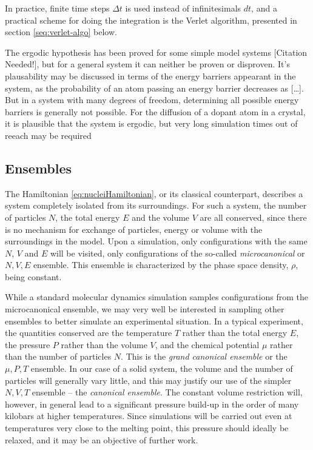 \documentclass[11pt,bibliography=totoc,index=totoc]{scrbook}   %
\begin{document}
In practice, finite time steps $\Delta t$ is used instead of infinitesimals $dt$, and a practical scheme for doing
the integration is the Verlet algorithm, presented in section \ref{seq:verlet-algo} below.

The ergodic hypothesis has been proved for some simple model systems [Citation Needed!], 
but for a general system it can neither be proven or disproven. 
It's plausability may be discussed in terms of the energy barriers appearant in the system,
as the probability of an atom passing an energy barrier decreases as [\ldots]. 
But in a system with many degrees of freedom, determining all possible energy barriers is generally not possible.
For the diffusion of a dopant atom in a crystal, it is plausible that the system is ergodic, but very long
simulation times out of reeach may be required


\subsection{Ensembles}

The Hamiltonian \eqref{eq:nucleiHamiltonian}, or its classical counterpart, describes a system completely isolated from its surroundings.
For such a system, the number of particles $N$, the total energy $E$ and the volume $V$ are all conserved, since there is no mechanism for exchange of particles, energy or volume with the surroundings in the model.
Upon a simulation, only configurations with the same $N$, $V$ and $E$ will be visited, only configurations of the so-called \emph{microcanonical} or $N,V,E$ ensemble. This ensemble is characterized by the phase space density, $\rho$, being constant.

While a standard molecular dynamics simulation samples configurations from the microcanonical ensemble, we may very well be interested in sampling other ensembles to better simulate an experimental situation. 
In a typical experiment, the quantities conserved are the temperature $T$ rather than the total energy $E$, the pressure $P$ rather than the volume $V$, and the chemical potential $\mu$ rather than the number of particles $N$. 
This is the \emph{grand canonical ensemble} or the $\mu,P,T$ ensemble. 
In our case of a solid system, the volume and the number of particles will generally vary little, and this may justify our use of the simpler $N,V,T$ ensemble -- the \emph{canonical ensemble}. 
The constant volume restriction will, however, in general lead to a significant pressure build-up in the order of many kilobars at higher temperatures. 
Since simulations will be carried out even at temperatures very close to the melting point, this pressure should ideally be relaxed, and it may be an objective of further work.
\end{document}
